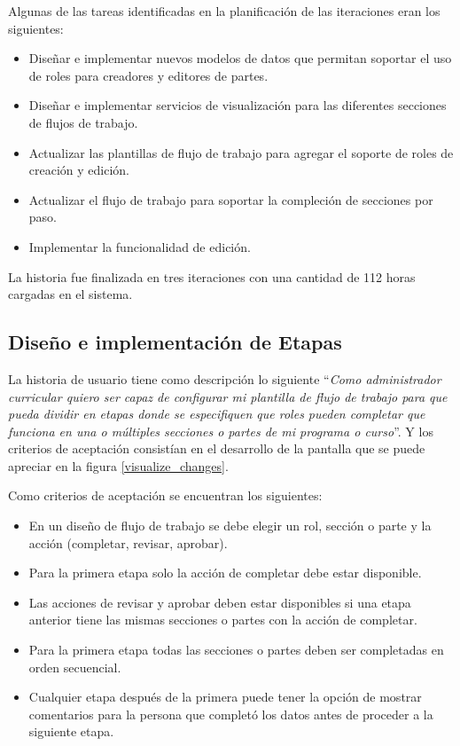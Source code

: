 Algunas de las tareas identificadas en la planificación de las iteraciones eran los siguientes:
\begin{itemize}
	\item Diseñar e implementar nuevos modelos de datos que permitan soportar el uso de roles para creadores y editores de partes.
	\item Diseñar e implementar servicios de visualización para las diferentes secciones de flujos de trabajo.
	\item Actualizar las plantillas de flujo de trabajo para agregar el soporte de roles de creación y edición.
	\item Actualizar el flujo de trabajo para soportar la compleción de secciones por paso.
	\item Implementar la funcionalidad de edición.
\end{itemize}

La historia fue finalizada en tres iteraciones con una cantidad de 112 horas cargadas en el sistema.


\subsection{Diseño e implementación de Etapas}
La historia de usuario tiene como descripción lo siguiente \enquote{\textit{Como administrador curricular quiero ser capaz de configurar mi plantilla de flujo de trabajo para que pueda dividir en etapas donde se especifiquen que roles pueden completar que funciona en una o múltiples secciones o partes de mi programa o curso}}. Y los criterios de aceptación consistían en el desarrollo de la pantalla que se puede apreciar en la figura \ref{visualize_changes}.

Como criterios de aceptación se encuentran los siguientes:
\begin{itemize}
	\item En un diseño de flujo de trabajo se debe elegir un rol, sección o parte y la acción (completar, revisar, aprobar).
	\item Para la primera etapa solo la acción de completar debe estar disponible.
	\item Las acciones de revisar y aprobar deben estar disponibles si una etapa anterior tiene las mismas secciones o partes con la acción de completar.
	\item Para la primera etapa todas las secciones o partes deben ser completadas en orden secuencial.
	\item Cualquier etapa después de la primera puede tener la opción de mostrar comentarios para la persona que completó los datos antes de proceder a la siguiente etapa.
\end{itemize}

